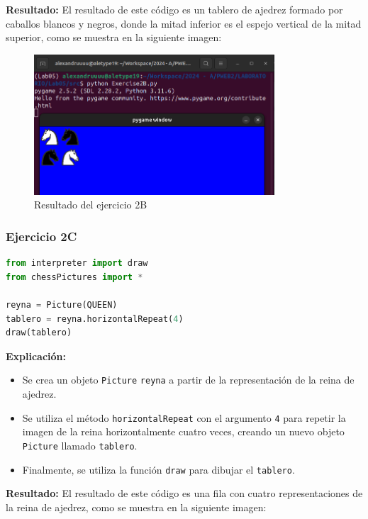 \documentclass{article}
\begin{document}
\begin{itemize}
\textbf{Resultado:}
El resultado de este código es un tablero de ajedrez formado por caballos blancos y negros, donde la mitad inferior es el espejo vertical de la mitad superior, como se muestra en la siguiente imagen:

\begin{figure}[H]
    \centering
    \includegraphics[width=0.8\textwidth]{img/2.png}
    \caption{Resultado del ejercicio 2B}
    \label{fig:ejercicio2b}
\end{figure}



\subsubsection{Ejercicio 2C}

\begin{lstlisting}[language=Python, caption={Código del ejercicio 2C}]
from interpreter import draw
from chessPictures import *

reyna = Picture(QUEEN)
tablero = reyna.horizontalRepeat(4)
draw(tablero)
\end{lstlisting}

\textbf{Explicación:}
\begin{itemize}
    \item Se crea un objeto \texttt{Picture} \texttt{reyna} a partir de la representación de la reina de ajedrez.
    \item Se utiliza el método \texttt{horizontalRepeat} con el argumento \texttt{4} para repetir la imagen de la reina horizontalmente cuatro veces, creando un nuevo objeto \texttt{Picture} llamado \texttt{tablero}.
    \item Finalmente, se utiliza la función \texttt{draw} para dibujar el \texttt{tablero}.
\end{itemize}

\textbf{Resultado:}
El resultado de este código es una fila con cuatro representaciones de la reina de ajedrez, como se muestra en la siguiente imagen:


\end{itemize}
\end{document}
